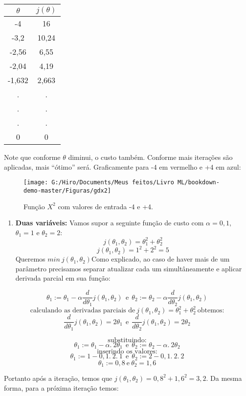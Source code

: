 \documentclass[
  openany]{book}
\providecommand{\tightlist}{%
  \setlength{\itemsep}{0pt}\setlength{\parskip}{0pt}}
\begin{document}
\begin{longtable}[]{@{}cc@{}}
\toprule
\textbf{\(\theta\)} & \textbf{\(j(\theta)\)}\tabularnewline
\midrule
\endhead
-4 & 16\tabularnewline
-3,2 & 10,24\tabularnewline
-2,56 & 6,55\tabularnewline
-2,04 & 4,19\tabularnewline
-1,632 & 2,663\tabularnewline
. & .\tabularnewline
. & .\tabularnewline
. & .\tabularnewline
0 & 0\tabularnewline
\bottomrule
\end{longtable}

Note que conforme \(\theta\) diminui, o custo também. Conforme mais iterações são aplicadas, mais ``ótimo'' será. Graficamente para -4 em vermelho e +4 em azul:

\begin{figure}

{\centering \texttt{[image: G:/Hiro/Documents/Meus feitos/Livro ML/bookdown-demo-master/Figuras/gdx2]} 

}

\caption{Função \(X^2\) com valores de entrada -4 e +4.}\label{fig:gdx2}
\end{figure}



\begin{enumerate}
\def\labelenumi{\arabic{enumi}.}
\setcounter{enumi}{1}
\tightlist
\item
  \textbf{Duas variáveis:} Vamos supor a seguinte função de custo com \(\alpha=0,1\), \(\theta_1=1\) e \(\theta_2=2\):
  \[j(\theta_1,\theta_2)=\theta_1^2+\theta_2^2\]
  \[j(\theta_1,\theta_2)=1^2+2^2=5\]
  Queremos \(min \ j(\theta_1,\theta_2)\)Como explicado, ao caso de haver mais de um parâmetro precisamos separar atualizar cada um simultâneamente e aplicar derivada parcial em sua função:
\end{enumerate}

\[\theta_1:=\theta_1-\alpha \frac{d}{d\theta_1}j(\theta_1,\theta_2) \ \ \mbox{e}\ \ \theta_2:=\theta_2-\alpha \frac{d}{d\theta_2}j(\theta_1,\theta_2)\]
\[\mbox{calculando as derivadas parciais de}\ j(\theta_1,\theta_2)=\theta_1^2+\theta_2^2\ \mbox{obtemos:}\]
\[\frac{d}{d\theta_1}j(\theta_1,\theta_2)=2\theta_1 \ \
\mbox{e}\ \ \frac{d}{d\theta_2}j(\theta_1,\theta_2)=2\theta_2\]

\[\mbox{substituindo:}\]
\[\theta_1:=\theta_1-\alpha.\ 2\theta_1 \ \ \mbox{e}\ \ \theta_2:=\theta_2-\alpha .\ 2\theta_2 \]
\[\mbox{inserindo os valores:}\]
\[\theta_1:=1-0,1.\ 2.\ 1 \ \ \mbox{e}\ \ \theta_2:=2-0,1.\ 2.\ 2\]
\[\theta_1:=0,8 \ \mbox{e} \ \theta_2=1,6\]

Portanto após a iteração, temos que \(j(\theta_1,\theta_2)=0,8^2+1,6^2=3,2\). Da mesma forma, para a próxima iteração temos:
\end{document}
